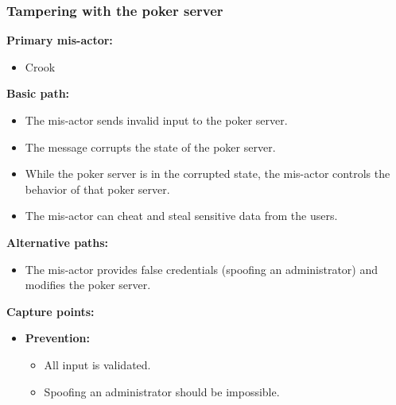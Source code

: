 \documentclass[a4paper,11pt]{report}
\begin{document}
\subsubsection{Tampering with the poker server}
\label{PokerServerCasesT}
\textbf{Primary mis-actor:}
\begin{itemize}
\item Crook
\end{itemize}
\textbf{Basic path:}
\begin{itemize}
\item The mis-actor sends invalid input to the poker server.
\item The message corrupts the state of the poker server. 
\item While the poker server is in the corrupted state, the mis-actor controls the behavior of that poker server.
\item The mis-actor can cheat and steal sensitive data from the users.
\end{itemize}
\textbf{Alternative paths:}
\begin{itemize}
\item The mis-actor provides false credentials (spoofing an administrator) and modifies the poker server.
\end{itemize}
\textbf{Capture points:}
\begin{itemize}
\item \textbf{Prevention:}
\begin{itemize}
\item All input is validated.
\item Spoofing an administrator should be impossible.
\end{itemize}
\end{itemize}
\end{document}
